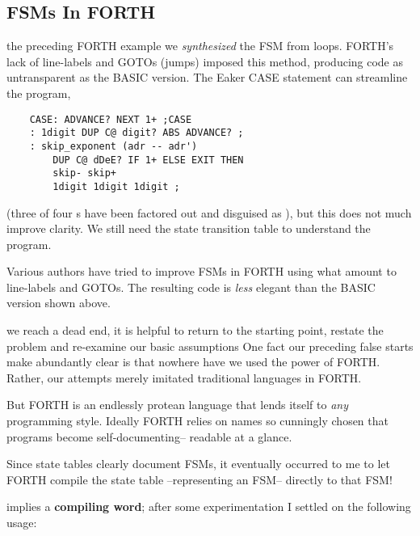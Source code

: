 \subsection{FSMs In FORTH}
 the preceding FORTH example we \textit{synthesized} the FSM from      loops. FORTH's lack of line-labels and GOTOs (jumps) imposed this method, producing code as untransparent as the BASIC version. The Eaker CASE statement can streamline the program,

\begin{lstlisting}
    CASE: ADVANCE? NEXT 1+ ;CASE
    : 1digit DUP C@ digit? ABS ADVANCE? ;
    : skip_exponent (adr -- adr')
        DUP C@ dDeE? IF 1+ ELSE EXIT THEN
        skip- skip+
        1digit 1digit 1digit ;
\end{lstlisting}

(three of four s have been factored out and disguised as    ), but this does not much improve clarity. We still need the state transition table to understand the program.

Various authors have tried to improve FSMs in FORTH using what amount to line-labels and GOTOs. The resulting code is \textit{less} elegant than the BASIC version shown above.

 we reach a dead end, it is helpful to return to the starting point, restate the problem and re-examine our basic assumptions One fact our preceding false starts make abundantly clear is that nowhere have we used the power of FORTH. Rather, our attempts merely imitated traditional languages in FORTH.

But FORTH is an endlessly protean language that lends itself to \textit{any} programming style. Ideally FORTH relies on names so cunningly chosen that programs become self-documenting-- readable at a glance.

Since state tables clearly document FSMs, it eventually occurred to me to let FORTH compile the state table --representing an FSM-- directly to that FSM!

implies a \textbf{compiling word}; after some experimentation I settled on the following usage:

